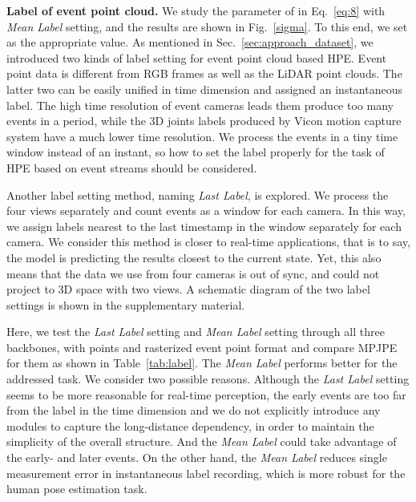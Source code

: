 \documentclass[10pt,twocolumn,letterpaper]{article}
\begin{document}
\noindent\textbf{Label of event point cloud.}
We study the parameter of  in Eq.~\ref{eq:8} with \emph{Mean Label} setting, and the results are shown in Fig.~\ref{sigma}. To this end, we set  as the appropriate value. As mentioned in Sec.~\ref{sec:approach_dataset}, we introduced two kinds of label setting for event point cloud based HPE.
Event point data is different from RGB frames as well as the LiDAR point clouds.
The latter two can be easily unified in time dimension and assigned an instantaneous label.
The high time resolution of event cameras leads them produce too many events in a period, while the 3D joints labels produced by Vicon motion capture system have a much lower time resolution.
We process the events in a tiny time window instead of an instant, so how to set the label properly for the task of HPE based on event streams should be considered.

Another label setting method, naming \emph{Last Label}, is explored. We process the four views separately and count  events as a window for each camera.
In this way, we assign labels nearest to the last timestamp in the window separately for each camera. We consider this method is closer to real-time applications, that is to say, the model is predicting the results closest to the current state.
Yet, this also means that the data we use from four cameras is out of sync, and could not project to 3D space with two views. A schematic diagram of the two label settings is shown in the supplementary material.

Here, we test the \emph{Last Label} setting and \emph{Mean Label} setting through all three backbones, with  points and rasterized event point format and compare MPJPE for them as shown in Table~\ref{tab:label}.
The \emph{Mean Label} performs better for the addressed task.
We consider two possible reasons.
Although the \emph{Last Label} setting seems to be more reasonable for real-time perception, the early events are too far from the label in the time dimension and we do not explicitly introduce any modules to capture the long-distance dependency, in order to maintain the simplicity of the overall structure. And the \emph{Mean Label} could take advantage of the early- and later events. On the other hand, the \emph{Mean Label} reduces single measurement error in instantaneous label recording, which is more robust for the human pose estimation task.
\end{document}
